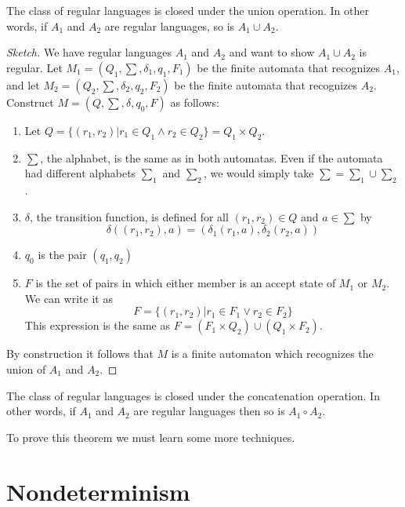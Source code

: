\documentclass[12pt, a4paper, oneside, openright, titlepage]{book}
\begin{document}
\begin{thm}
    The class of regular languages is closed under the union operation. In other words, if $A_1$ and $A_2$ are regular languages, so is $A_1\cup A_2$.
\end{thm}
\begin{proof}[Sketch]
    We have regular languages $A_1$ and $A_2$ and want to show $A_1 \cup A_2$ is regular. Let $M_1 = (Q_1,\sum,\delta_1,q_1,F_1)$ be the finite automata that recognizes $A_1$, and let $M_2 = (Q_2,\sum,\delta_2,q_2,F_2)$ be the finite automata that recognizes $A_2$. Construct $M = (Q,\sum,\delta,q_0,F)$ as follows: \begin{enumerate}
        \item Let $Q = \{(r_1,r_2)\vert r_1 \in Q_1\land r_2 \in Q_2\} = Q_1\times Q_2$.
        \item $\sum$, the alphabet, is the same as in both automatas. Even if the automata had different alphabets $\sum_1$ and $\sum_2$, we would simply take $\sum = \sum_1\cup \sum_2$.
        \item $\delta$, the transition function, is defined for all $(r_1,r_2) \in Q$ and $a \in \sum$ by \begin{equation*}
                \delta((r_1,r_2),a) = (\delta_1(r_1,a),\delta_2(r_2,a))
            \end{equation*}
        \item $q_0$ is the pair $(q_1,q_2)$
        \item $F$ is the set of pairs in which either member is an accept state of $M_1$ or $M_2$. We can write it as \begin{equation*}
                F = \{(r_1,r_2)\vert r_1 \in F_1\lor r_2 \in F_2\}
        \end{equation*}
        This expression is the same as $F= (F_1\times Q_2)\cup(Q_1\times F_2)$.
    \end{enumerate}
    By construction it follows that $M$ is a finite automaton which recognizes the union of $A_1$ and $A_2$.
\end{proof}

\begin{thm}
    The class of regular languages is closed under the concatenation operation. In other words, if $A_1$ and $A_2$ are regular languages then so is $A_1 \circ A_2$.
\end{thm}

To prove this theorem we must learn some more techniques.


\section{Nondeterminism}
\end{document}
